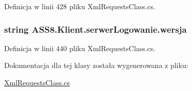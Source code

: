 Definicja w linii 428 pliku XmlRequestsClass.cs.\hypertarget{a00025_4790b4d929cd024c7ab8f983f1e507cd}{
\subsubsection[{wersja}]{\setlength{\rightskip}{0pt plus 5cm}string ASS8.Klient.serwerLogowanie.wersja}}
\label{d3/dfe/a00025_4790b4d929cd024c7ab8f983f1e507cd}




Definicja w linii 440 pliku XmlRequestsClass.cs.

Dokumentacja dla tej klasy została wygenerowana z pliku:\begin{CompactItemize}
\item 
\hyperlink{a00055}{XmlRequestsClass.cs}\end{CompactItemize}
